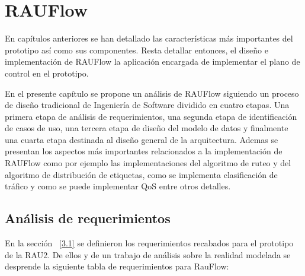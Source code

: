 \chapter{RAUFlow}
\label{Capítulo 5}

\ifpdf
    \graphicspath{{Chapter5/Figs/Raster/}{Chapter5/Figs/PDF/}{Chapter5/Figs/}}
\else
    \graphicspath{{Chapter5/Figs/Vector/}{Chapter5/Figs/}}
\fi

En cap\'itulos anteriores se han detallado las caracter\'isticas m\'as importantes del prototipo así como sus componentes. Resta detallar entonces, el dise\~no e implementaci\'on de RAUFlow la aplicaci\'on encargada de implementar el plano de control en el prototipo. 

En el presente cap\'itulo se propone un an\'alisis de RAUFlow siguiendo un proceso de dise\~no tradicional de Ingenier\'ia de Software dividido en cuatro etapas. Una primera etapa de an\'alisis de requerimientos, una segunda etapa de identificaci\'on de casos de uso, una tercera etapa de dise\~no del modelo de datos y finalmente una cuarta etapa destinada al dise\~no general de la arquitectura. Ademas se presentan los aspectos m\'as importantes relacionados a la implementaci\'on de RAUFlow como por ejemplo las implementaciones del algoritmo de ruteo y del algoritmo de distribución de etiquetas, como se implementa clasificaci\'on de tr\'afico y como se puede implementar QoS entre otros detalles. 

\section[An\'alisis de requerimientos]{An\'alisis de requerimientos}
\label{section5.1}

En la sección ~\ref{3.1} se definieron los requerimientos recabados para el prototipo de la RAU2. De ellos y de un trabajo de an\'alisis sobre la realidad modelada se desprende la siguiente tabla de requerimientos para RauFlow:

